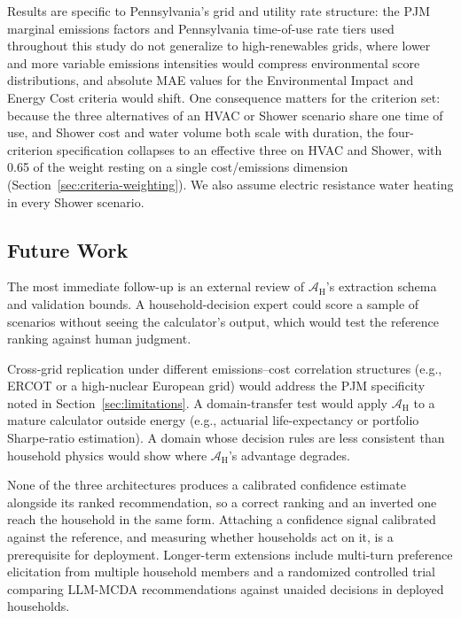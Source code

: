 \documentclass[final,3p,times]{elsarticle}
\begin{document}
Results are specific to Pennsylvania's grid and utility rate structure: the PJM marginal emissions factors and Pennsylvania time-of-use rate tiers used throughout this study do not generalize to high-renewables grids, where lower and more variable emissions intensities would compress environmental score distributions, and absolute MAE values for the Environmental Impact and Energy Cost criteria would shift. One consequence matters for the criterion set: because the three alternatives of an HVAC or Shower scenario share one time of use, and Shower cost and water volume both scale with duration, the four-criterion specification collapses to an effective three on HVAC and Shower, with 0.65 of the weight resting on a single cost/emissions dimension (Section~\ref{sec:criteria-weighting}). We also assume electric resistance water heating in every Shower scenario.

\FloatBarrier
\subsection{Future Work}
\label{sec:futurework}
The most immediate follow-up is an external review of $\mathcal{A}_{\text{H}}$'s extraction schema and validation bounds. A household-decision expert could score a sample of scenarios without seeing the calculator's output, which would test the reference ranking against human judgment.

Cross-grid replication under different emissions--cost correlation structures (e.g., ERCOT or a high-nuclear European grid) would address the PJM specificity noted in Section~\ref{sec:limitations}. A domain-transfer test would apply $\mathcal{A}_{\text{H}}$ to a mature calculator outside energy (e.g., actuarial life-expectancy or portfolio Sharpe-ratio estimation). A domain whose decision rules are less consistent than household physics would show where $\mathcal{A}_{\text{H}}$'s advantage degrades.

None of the three architectures produces a calibrated confidence estimate alongside its ranked recommendation, so a correct ranking and an inverted one reach the household in the same form. Attaching a confidence signal calibrated against the reference, and measuring whether households act on it, is a prerequisite for deployment. Longer-term extensions include multi-turn preference elicitation from multiple household members and a randomized controlled trial comparing LLM-MCDA recommendations against unaided decisions in deployed households.

\FloatBarrier
\end{document}

